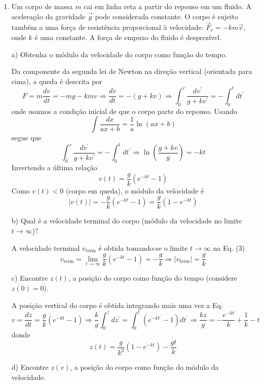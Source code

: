 \begin{enumerate}[start=1,label={\bfseries Q\arabic*.}]
\resposta





\item Um corpo de massa $m$ cai em linha reta a partir do repouso em um fluido. A aceleração da gravidade $\vec{g}$ pode considerada constante. O corpo é sujeito também a uma força de resistência proporcional à velocidade: $\vec{F}_{r} = -km\vec{v}$, onde $k$ é uma constante. A força de empuxo do fluido é desprezível.


a) Obtenha o módulo da velocidade do corpo como função do tempo.

\resposta Da componente da segunda lei de Newton na direção vertical (orientada para cima), a queda é descrita por
$$
F=m \frac{d v}{d t}=-m g-k m v \Rightarrow \frac{d v}{d t}=-(g+k v) \Rightarrow \int_{0}^{v} \frac{d v^{\prime}}{g+k v^{\prime}}=-\int_{0}^{t} d t^{\prime}
$$
onde usamos a condição inicial de que o corpo parte do repouso. Usando
$$
\int \frac{d x}{a x+b}=\frac{1}{a} \ln (a x+b)
$$
segue que
$$
\int_{0}^{v} \frac{d v^{\prime}}{g+k v^{\prime}}=-\int_{0}^{t} d t^{\prime} \Rightarrow \ln \left(\frac{g+k v}{g}\right)=-k t
$$
Invertendo a última relação
$$
v(t)=\frac{g}{k}\left(e^{-k t}-1\right)
$$
Como $v(t)<0$ (corpo em queda), o módulo da velocidade é
$$
|v(t)|=-\frac{g}{k}\left(e^{-k t}-1\right)=\frac{g}{k}\left(1-e^{-k t}\right)
$$

b) Qual é a velocidade terminal do corpo (módulo da velocidade no limite $t \rightarrow \infty$)?

\resposta A velocidade terminal $v_{\text {term}}$ é obtida tomando-se o limite $t \rightarrow \infty$ na Eq. (3)
$$
v_{\text {term}}=\lim _{t \rightarrow \infty} \frac{g}{k}\left(e^{-k t}-1\right)=-\frac{g}{k} \Rightarrow\left|v_{\text {term}}\right|=\frac{g}{k}
$$

c) Encontre $z(t)$, a posição do corpo como função do tempo (considere $z(0) = 0$).

\resposta A posição vertical do corpo é obtida integrando mais uma vez a Eq.
$$
v=\frac{d z}{d t}=\frac{g}{k}\left(e^{-k t}-1\right) \Rightarrow \frac{k}{g} \int_{0}^{z} d z^{\prime}=\int_{0}^{t}\left(e^{-k t^{\prime}}-1\right) d t^{\prime} \Rightarrow \frac{k z}{g}=-\frac{e^{-k t}}{k}+\frac{1}{k}-t
$$
donde
$$
z(t)=\frac{g}{k^{2}}\left(1-e^{-k t}\right)-\frac{g t}{k}
$$

d) Encontre $z(v)$, a posição do corpo como função do módulo da velocidade.


\end{enumerate}
